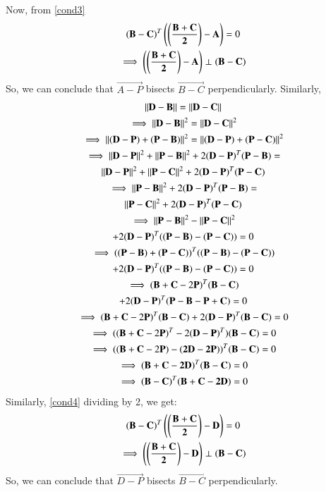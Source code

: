 \documentclass[journal,12pt,twocolumn]{IEEEtran}
\renewcommand\thesection{\arabic{section}}
\begin{document}
Now, from \ref{cond3}
\begin{multline}
(\mathbf{B-C})^T \left(\mathbf{\left(\frac{B+C}{2}\right)-A}\right)=0\\
\implies \left(\mathbf{\left(\frac{B+C}{2}\right)-A}\right) \perp (\mathbf{B-C})
\end{multline}
So, we can conclude that $\vec{A-P}$ bisects $\vec{B-C}$ perpendicularly.
Similarly, 
\begin{multline}
\left\lVert\mathbf{D-B}\right\rVert = \left\lVert\mathbf{D-C}\right\rVert\\
\implies \left\lVert\mathbf{D-B}\right\rVert^2 = \left\lVert\mathbf{D-C}\right\rVert^2\\
\implies \left\lVert{(\mathbf{D-P}) + (\mathbf{P-B})}\right\rVert^2 = \left\lVert{(\mathbf{D-P}) + (\mathbf{P-C})}\right\rVert^2\\
\implies \left\lVert\mathbf{D-P}\right\rVert^2 + \left\lVert\mathbf{P-B}\right\rVert^2 + 2(\mathbf{D-P})^T (\mathbf{P-B})=\\
\left\lVert\mathbf{D-P}\right\rVert^2 + \left\lVert\mathbf{P-C}\right\rVert^2 + 2(\mathbf{D-P})^T (\mathbf{P-C})\\
\implies \left\lVert\mathbf{P-B}\right\rVert^2 + 2(\mathbf{D-P})^T (\mathbf{P-B})=\\
\left\lVert\mathbf{P-C}\right\rVert^2 + 2(\mathbf{D-P})^T (\mathbf{P-C})\\
\implies \left\lVert\mathbf{P-B}\right\rVert^2 -\left\lVert\mathbf{P-C}\right\rVert^2\\
 + 2(\mathbf{D-P})^T ((\mathbf{P-B})-(\mathbf{P-C})) =0\\
\implies ((\mathbf{P-B})+(\mathbf{P-C}))^T ((\mathbf{P-B})-(\mathbf{P-C}))\\
+ 2(\mathbf{D-P})^T ((\mathbf{P-B})-(\mathbf{P-C})) =0\\
\implies (\mathbf{B}+\mathbf{C}-2\mathbf{P})^T (\mathbf{B-C})\\
+2(\mathbf{D-P})^T (\mathbf{P}-\mathbf{B}-\mathbf{P}+\mathbf{C}) =0\\
\implies (\mathbf{B}+\mathbf{C}-2\mathbf{P})^T (\mathbf{B-C})+2(\mathbf{D-P})^T (\mathbf{B-C}) =0\\
\implies ((\mathbf{B}+\mathbf{C}-2\mathbf{P})^T - 2(\mathbf{D-P})^T) (\mathbf{B-C})=0\\
\implies ((\mathbf{B}+\mathbf{C}-2\mathbf{P})-(\mathbf{2D-2P}))^T (\mathbf{B-C})=0\\
\implies (\mathbf{B+C-2D})^T (\mathbf{B-C})=0\\
\implies (\mathbf{B-C})^T (\mathbf{B+C-2D})=0\\
\label{cond4}
\end{multline}
Similarly, \ref{cond4} dividing by 2, we get:
\begin{multline}
(\mathbf{B-C})^T \left(\mathbf{\left(\frac{B+C}{2}\right)-D}\right)=0\\
\implies \left(\mathbf{\left(\frac{B+C}{2}\right)-D}\right) \perp (\mathbf{B-C})
\end{multline}
So, we can conclude that $\vec{D-P}$ bisects $\vec{B-C}$ perpendicularly.
\renewcommand{\theequation}{\theenumi}
%
\end{document}
